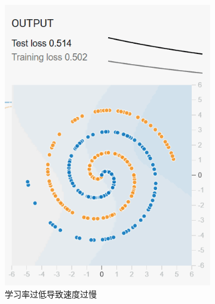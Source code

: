 \documentclass[printMode=true, declarePage=false]{ecnuthesis}
\begin{document}
    \begin{figure}[htbp]
        \centering
        \begin{subfigure}[b]{0.3\textwidth}
            \centering
            \includegraphics[width=\textwidth]{too-slow-000001.png}
            \caption{学习率过低导致速度过慢}
            \label{fig:step021}
        \end{subfigure}
        \hfill
        \begin{subfigure}[b]{0.3\textwidth}
            \centering

\end{subfigure}
\end{figure}
\end{document}
